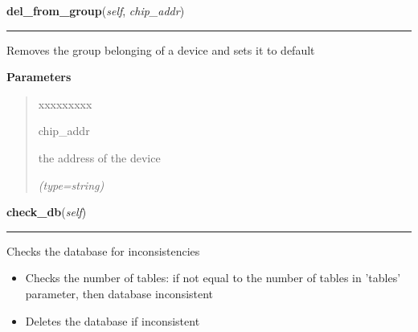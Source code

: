     \label{DBE:DBE:del_from_group}

    \vspace{0.5ex}

\hspace{.8\funcindent}\begin{boxedminipage}{\funcwidth}

    \raggedright \textbf{del\_from\_group}(\textit{self}, \textit{chip\_addr})

    \vspace{-1.5ex}

    \rule{\textwidth}{0.5\fboxrule}
\setlength{\parskip}{2ex}
    Removes the group belonging of a device and sets it to default

\setlength{\parskip}{1ex}
      \textbf{Parameters}
      \vspace{-1ex}

      \begin{quote}
        \begin{Ventry}{xxxxxxxxx}

          \item[chip\_addr]

          the address of the device

            {\it (type=string)}

        \end{Ventry}

      \end{quote}

    \end{boxedminipage}

    \label{DBE:DBE:check_db}

    \vspace{0.5ex}

\hspace{.8\funcindent}\begin{boxedminipage}{\funcwidth}

    \raggedright \textbf{check\_db}(\textit{self})

    \vspace{-1.5ex}

    \rule{\textwidth}{0.5\fboxrule}
\setlength{\parskip}{2ex}
    Checks the database for inconsistencies

    \begin{itemize}
    \setlength{\parskip}{0.6ex}
      \item Checks the number of tables: if not equal to the number of tables 
        in 'tables' parameter, then database inconsistent

      \item Deletes the database if inconsistent

    \end{itemize}

\setlength{\parskip}{1ex}
    \end{boxedminipage}

